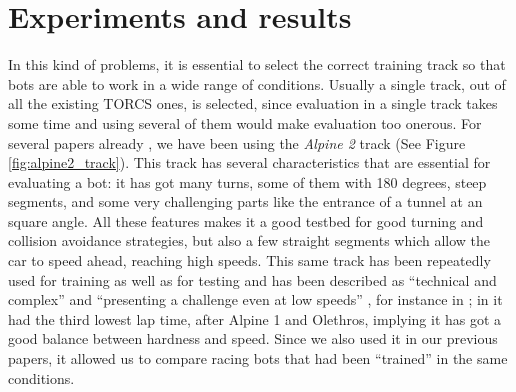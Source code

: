 \documentclass[10pt,journal,compsoc]{IEEEtran}
\begin{document}


\section{Experiments and results}  
\label{sec:results}


In this kind of problems, it is essential to select the correct
training track so that bots are able to work in a wide range of
conditions. Usually a single track, out of all the existing TORCS
ones, is selected, since evaluation in a single track takes some time
and using several of them would make evaluation too onerous. For
several papers already \cite{salem_cig2018,DBLP:conf/cig/SalemMG19},
we have been using the \textit{Alpine 2} track (See Figure
\ref{fig:alpine2_track}). This track has several characteristics that
are essential for evaluating a bot: it has got many turns, some of
them with 180 degrees, steep segments, and some very challenging parts
like the entrance of a tunnel at an square angle. All these features makes
it a good testbed for good turning and collision avoidance
strategies, but also a few straight segments which allow the car to
speed ahead, reaching high speeds. This same track has been repeatedly
used for training as well as for testing and has been described as
``technical and complex'' \cite{AG} and ``presenting a challenge even
at low speeds'' \cite{vrajitoru2018global}, for instance in
\cite{cardamone2010applying,CarRacing_Pelta09,zong2017obstacle}; in \cite{AG} it had the third lowest lap time, after Alpine 1 and Olethros, implying it
has got a good balance between hardness and speed. Since we also used
it in our previous papers, it allowed us to compare racing bots that
had been ``trained'' in the same conditions.
\end{document}

